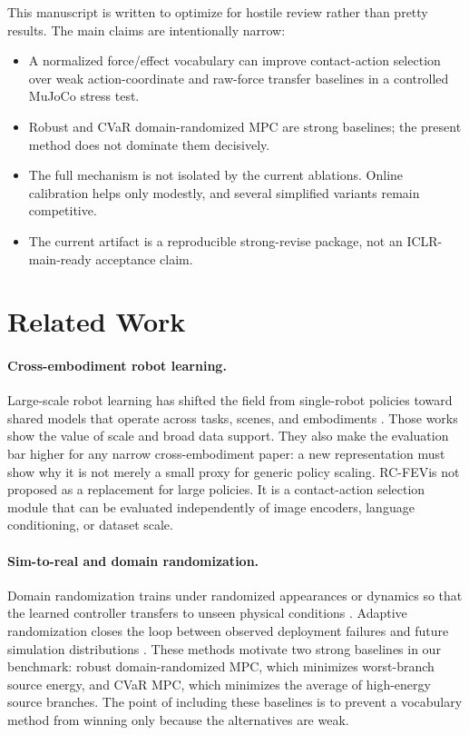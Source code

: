 \documentclass{article}
\newcommand{\method}{RC-FEV}
\begin{document}
This manuscript is written to optimize for hostile review rather than pretty results. The main claims are intentionally narrow:

\begin{itemize}
\item A normalized force/effect vocabulary can improve contact-action selection over weak action-coordinate and raw-force transfer baselines in a controlled MuJoCo stress test.
\item Robust and CVaR domain-randomized MPC are strong baselines; the present method does not dominate them decisively.
\item The full mechanism is not isolated by the current ablations. Online calibration helps only modestly, and several simplified variants remain competitive.
\item The current artifact is a reproducible strong-revise package, not an ICLR-main-ready acceptance claim.
\end{itemize}

\section{Related Work}

\paragraph{Cross-embodiment robot learning.}
Large-scale robot learning has shifted the field from single-robot policies toward shared models that operate across tasks, scenes, and embodiments \citep{brohan2023rt1,brohan2023rt2,openx2023}. Those works show the value of scale and broad data support. They also make the evaluation bar higher for any narrow cross-embodiment paper: a new representation must show why it is not merely a small proxy for generic policy scaling. \method is not proposed as a replacement for large policies. It is a contact-action selection module that can be evaluated independently of image encoders, language conditioning, or dataset scale.

\paragraph{Sim-to-real and domain randomization.}
Domain randomization trains under randomized appearances or dynamics so that the learned controller transfers to unseen physical conditions \citep{tobin2017domain,peng2018sim}. Adaptive randomization closes the loop between observed deployment failures and future simulation distributions \citep{chebotar2019closing}. These methods motivate two strong baselines in our benchmark: robust domain-randomized MPC, which minimizes worst-branch source energy, and CVaR MPC, which minimizes the average of high-energy source branches. The point of including these baselines is to prevent a vocabulary method from winning only because the alternatives are weak.
\end{document}
